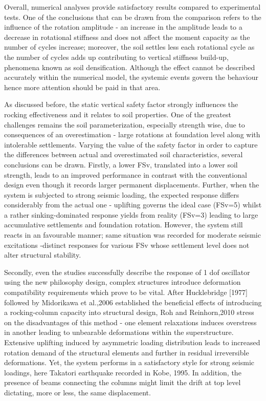 \documentclass[12pt,a4paper]{report}
\begin{document}
Overall, numerical analyses provide satisfactory results compared to experimental tests. One of the conclusions that can be drawn from the comparison refers to the influence of the rotation amplitude - an increase in the amplitude leads to a decrease in rotational stiffness and does not affect the moment capacity as the number of cycles increase; moreover, the soil settles less each rotational cycle as the number of cycles adds up contributing to vertical stiffness build-up, phenomena known as soil densification. Although the effect cannot be described accurately within the numerical model, the systemic events govern the behaviour hence more attention should be paid in that area.

As discussed before, the static vertical safety factor strongly influences the rocking effectiveness and it relates to soil properties. One of the greatest challenges remains the soil parameterization, especially strength wise, due to consequences of an overestimation - large rotations at foundation level along with intolerable settlements. Varying the value of the safety factor in order to capture the differences between actual and overestimated soil characteristics, several conclusions can be drawn. Firstly, a lower FSv, translated into a lower soil strength, leads to an improved performance in contrast with the conventional design even though it records larger permanent displacements. Further, when the system is subjected to strong seismic loading, the expected response differs considerably from the actual one - uplifting governs the ideal case (FSv=5) whilst a rather sinking-dominated response yields from reality (FSv=3) leading to large accumulative settlements and foundation rotation. However, the system still reacts in an favourable manner; same situation was recorded for moderate seismic excitations -distinct responses for various FSv whose settlement level does not alter structural stability. 

Secondly, even the studies successfully describe the response of 1 dof oscillator using the new philosophy design, complex structures introduce deformation compatibility requirements which prove to be vital. After Hucklebridge [1977] followed by Midorikawa et al.,2006 \cite{kanno2006new} established the beneficial effects of introducing a rocking-column capacity into structural design, Roh and Reinhorn,2010 \cite{roh2010modeling} stress on the disadvantages of this method - one element relaxations induces overstress in another leading to unbearable deformations within the superstructure. Extensive uplifting induced by asymmetric loading distribution leads to increased rotation demand of the structural elements and further in residual irreversible deformations. Yet, the system performs in a satisfactory style for strong seismic loadings, here Takatori earthquake recorded in Kobe, 1995. In addition, the presence of beams connecting the columns might limit the drift at top level dictating, more or less, the same displacement.
\end{document}

